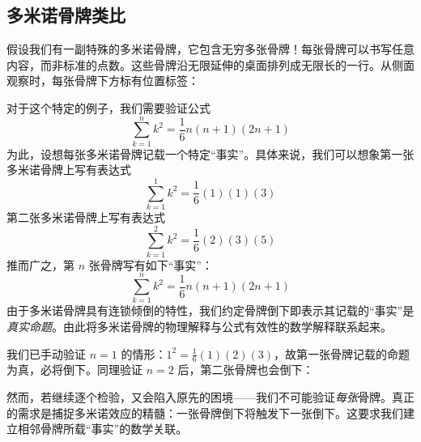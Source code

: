 \subsection{多米诺骨牌类比}

假设我们有一副特殊的多米诺骨牌，它包含无穷多张骨牌！每张骨牌可以书写任意内容，而非标准的点数。这些骨牌沿无限延伸的桌面排列成无限长的一行。从侧面观察时，每张骨牌下方标有位置标签：

\begin{center}
\end{center}

对于这个特定的例子，我们需要验证公式
\[\sum_{k=1}^{n}k^2 = \frac{1}{6}n(n+1)(2n+1)\]
为此，设想每张多米诺骨牌记载一个特定``事实''。具体来说，我们可以想象第一张多米诺骨牌上写有表达式
\[\sum_{k=1}^{1}k^2 = \frac{1}{6}(1)(1)(3)\]
第二张多米诺骨牌上写有表达式
\[\sum_{k=1}^{2}k^2 = \frac{1}{6}(2)(3)(5)\]
推而广之，第 $n$ 张骨牌写有如下``事实''：
\[\sum_{k=1}^{n}k^2 = \frac{1}{6}n(n+1)(2n+1)\]
由于多米诺骨牌具有连锁倾倒的特性，我们约定骨牌倒下即表示其记载的``事实''是\emph{真实命题}。由此将多米诺骨牌的物理解释与公式有效性的数学解释联系起来。

我们已手动验证 $n=1$ 的情形：$1^2=\frac{1}{6}(1)(2)(3)$，故第一张骨牌记载的命题为真，必将倒下。同理验证 $n=2$ 后，第二张骨牌也会倒下：

\begin{center}
\end{center}
然而，若继续逐个检验，又会陷入原先的困境——我们不可能验证\emph{每张}骨牌。真正的需求是捕捉多米诺效应的精髓：一张骨牌倒下将触发下一张倒下。这要求我们建立相邻骨牌所载``事实''的数学关联。

